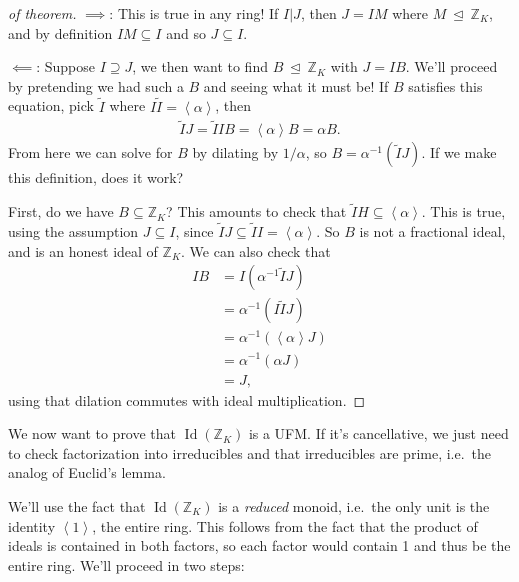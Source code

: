 \begin{proof}[of theorem]

\(\implies\): This is true in any ring! If \(I\mathrel{\Big|}J\), then
\(J = IM\) where \(M {~\trianglelefteq~}{\mathbb{Z}}_K\), and by
definition \(IM \subseteq I\) and so \(J \subseteq I\).

\hfill\break

\(\impliedby\): Suppose \(I \supseteq J\), we then want to find
\(B {~\trianglelefteq~}{\mathbb{Z}}_K\) with \(J = IB\). We'll proceed
by pretending we had such a \(B\) and seeing what it must be! If \(B\)
satisfies this equation, pick \(\tilde I\) where
\(I\tilde I = \left\langle{ \alpha}\right\rangle\), then
\begin{align*}
\tilde I J = \tilde I I B = \left\langle{ \alpha }\right\rangle B = \alpha B 
.\end{align*}
From here we can solve for \(B\) by dilating by \(1/ \alpha\), so
\(B = \alpha ^{-1} (\tilde I J)\). If we make this definition, does it
work?

\hfill\break

First, do we have \(B \subseteq {\mathbb{Z}}_K\)? This amounts to check
that \(\tilde I H \subseteq \left\langle{ \alpha }\right\rangle\). This
is true, using the assumption \(J \subseteq I\), since
\(\tilde I J \subseteq \tilde I I = \left\langle{ \alpha }\right\rangle\).
So \(B\) is not a fractional ideal, and is an honest ideal of
\({\mathbb{Z}}_K\). We can also check that
\begin{align*}
IB 
&= I( \alpha ^{-1} \tilde I J) \\
& = \alpha^{-1}(I \tilde I J) \\
&= \alpha^{-1}( \left\langle{ \alpha }\right\rangle J ) \\
&= \alpha ^{-1} ( \alpha J) \\
&= J
,\end{align*}
using that dilation commutes with ideal multiplication.

\end{proof}

\begin{remark}

We now want to prove that \(\operatorname{Id}({\mathbb{Z}}_K)\) is a
UFM. If it's cancellative, we just need to check factorization into
irreducibles and that irreducibles are prime, i.e.~the analog of
Euclid's lemma.

\end{remark}

\begin{remark}

We'll use the fact that \(\operatorname{Id}({\mathbb{Z}}_K)\) is a
\emph{reduced} monoid, i.e.~the only unit is the identity
\(\left\langle{ 1 }\right\rangle\), the entire ring. This follows from
the fact that the product of ideals is contained in both factors, so
each factor would contain 1 and thus be the entire ring. We'll proceed
in two steps:

\end{remark}

